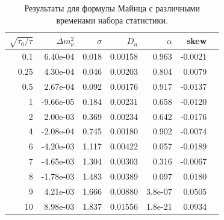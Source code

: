 \documentclass[a4paper,14pt]{extarticle}
\begin{document}
    \begin{table}[h!]
	    \begin{center}
	      \caption{Результаты для формулы Майнца с различными временами набора статистики.}
		    \begin{tabular}{|r|r|r|r|r|r|r|}
		    	\hline
		      $\sqrt{\tau_0/\tau}$ & $\Delta m^2_\nu$ & $\sigma$ & $D_n$ & $\alpha$ & skew \\
		      \hline
			    0.1 & 6.40e-04 & 0.018 & 0.00158 & 0.963 & -0.0021 \\
			    \hline
			    0.25 & 4.30e-04 & 0.046 & 0.00203 & 0.804 & 0.0079 \\
			    \hline
			    0.5 & 2.67e-04 & 0.092 & 0.00176 & 0.917 & -0.0137 \\
			    \hline
			    1 & -9.66e-05 & 0.184 & 0.00231 & 0.658 & -0.0120 \\
			    \hline
			    2 & 2.00e-03 & 0.369 & 0.00234 & 0.642 & -0.0176 \\
			    \hline
			    4 & -2.08e-04 & 0.745 & 0.00180 & 0.902 & -0.0074 \\
			    \hline
			    6 & -4.20e-03 & 1.117 & 0.00422 & 0.057 & -0.0189 \\
			    \hline
			    7 & -4.65e-03 & 1.304 & 0.00303 & 0.316 & -0.0067 \\
			    \hline
			    8 & -1.78e-03 & 1.483 & 0.00389 & 0.097 & 0.0180 \\
			    \hline
			    9 & 4.21e-03 & 1.666 & 0.00880 & 3.8e-07 & 0.0505 \\
			    \hline
			    10 & 8.98e-03 & 1.837 & 0.01556 & 1.8e-21 & 0.0934 \\
			    \hline
		    \end{tabular}
	    \end{center}
    \end{table}
    
\end{document}
